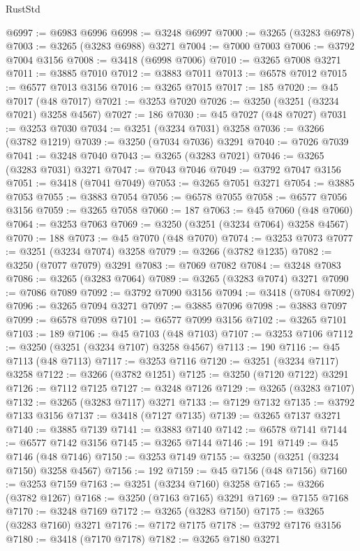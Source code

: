 \begin{lexlean}{RustStd}
\begin{coremodule}
@6997 := @6983 @6996
@6998 := @3248 @6997
@7000 := @3265 (@3283 @6978)
@7003 := @3265 (@3283 @6988) @3271
@7004 := @7000 @7003
@7006 := @3792 @7004 @3156
@7008 := @3418 (@6998 @7006)
@7010 := @3265 @7008 @3271
@7011 := @3885 @7010
@7012 := @3883 @7011
@7013 := @6578 @7012
@7015 := @6577 @7013 @3156
@7016 := @3265 @7015
@7017 := 185
@7020 := @45 @7017 (@48 @7017)
@7021 := @3253 @7020
@7026 := @3250 (@3251 (@3234 @7021) @3258 @4567)
@7027 := 186
@7030 := @45 @7027 (@48 @7027)
@7031 := @3253 @7030
@7034 := @3251 (@3234 @7031) @3258
@7036 := @3266 (@3782 @1219)
@7039 := @3250 (@7034 @7036) @3291
@7040 := @7026 @7039
@7041 := @3248 @7040
@7043 := @3265 (@3283 @7021)
@7046 := @3265 (@3283 @7031) @3271
@7047 := @7043 @7046
@7049 := @3792 @7047 @3156
@7051 := @3418 (@7041 @7049)
@7053 := @3265 @7051 @3271
@7054 := @3885 @7053
@7055 := @3883 @7054
@7056 := @6578 @7055
@7058 := @6577 @7056 @3156
@7059 := @3265 @7058
@7060 := 187
@7063 := @45 @7060 (@48 @7060)
@7064 := @3253 @7063
@7069 := @3250 (@3251 (@3234 @7064) @3258 @4567)
@7070 := 188
@7073 := @45 @7070 (@48 @7070)
@7074 := @3253 @7073
@7077 := @3251 (@3234 @7074) @3258
@7079 := @3266 (@3782 @1235)
@7082 := @3250 (@7077 @7079) @3291
@7083 := @7069 @7082
@7084 := @3248 @7083
@7086 := @3265 (@3283 @7064)
@7089 := @3265 (@3283 @7074) @3271
@7090 := @7086 @7089
@7092 := @3792 @7090 @3156
@7094 := @3418 (@7084 @7092)
@7096 := @3265 @7094 @3271
@7097 := @3885 @7096
@7098 := @3883 @7097
@7099 := @6578 @7098
@7101 := @6577 @7099 @3156
@7102 := @3265 @7101
@7103 := 189
@7106 := @45 @7103 (@48 @7103)
@7107 := @3253 @7106
@7112 := @3250 (@3251 (@3234 @7107) @3258 @4567)
@7113 := 190
@7116 := @45 @7113 (@48 @7113)
@7117 := @3253 @7116
@7120 := @3251 (@3234 @7117) @3258
@7122 := @3266 (@3782 @1251)
@7125 := @3250 (@7120 @7122) @3291
@7126 := @7112 @7125
@7127 := @3248 @7126
@7129 := @3265 (@3283 @7107)
@7132 := @3265 (@3283 @7117) @3271
@7133 := @7129 @7132
@7135 := @3792 @7133 @3156
@7137 := @3418 (@7127 @7135)
@7139 := @3265 @7137 @3271
@7140 := @3885 @7139
@7141 := @3883 @7140
@7142 := @6578 @7141
@7144 := @6577 @7142 @3156
@7145 := @3265 @7144
@7146 := 191
@7149 := @45 @7146 (@48 @7146)
@7150 := @3253 @7149
@7155 := @3250 (@3251 (@3234 @7150) @3258 @4567)
@7156 := 192
@7159 := @45 @7156 (@48 @7156)
@7160 := @3253 @7159
@7163 := @3251 (@3234 @7160) @3258
@7165 := @3266 (@3782 @1267)
@7168 := @3250 (@7163 @7165) @3291
@7169 := @7155 @7168
@7170 := @3248 @7169
@7172 := @3265 (@3283 @7150)
@7175 := @3265 (@3283 @7160) @3271
@7176 := @7172 @7175
@7178 := @3792 @7176 @3156
@7180 := @3418 (@7170 @7178)
@7182 := @3265 @7180 @3271

\end{coremodule}
\end{lexlean}

